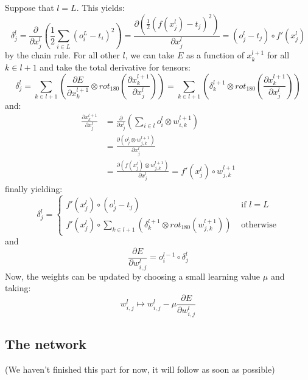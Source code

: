 \documentclass[12pt, titlepage]{article}
\begin{document}
		Suppose that $l=L$. This yields:
		\begin{equation*}
		\delta_j^l = \frac{\partial}{\partial x^l_j}\left(\frac12\sum_{i\in L}\left(o^L_i-t_i\right)^2\right) = \frac{\partial(\frac12(f(x^l_j)-t_j)^2)}{\partial x^l_j} = (o^l_j-t_j)\circ f'(x^l_j)
		\end{equation*}
		by the chain rule. For all other $l$, we can take $E$ as a function of $x^{l+1}_k$ for all $k\in l+1$ and take the total derivative for tensors:
		\begin{equation*}
		\delta^l_j = \sum_{k\in l+1}\left(\frac{\partial E}{\partial x^{l+1}_k}\otimes rot_{180}\left(\frac{\partial x^{l+1}_k}{\partial x^l_j}\right)\right) = \sum_{k\in l+1}\left(\delta^{l+1}_k\otimes rot_{180}\left(\frac{\partial x^{l+1}_k}{\partial x^l_j}\right)\right)
		\end{equation*}
		and:
		\begin{align*}
		\frac{\partial x^{l+1}_k}{\partial x^l_j} &= \frac{\partial}{\partial x^l_j}\left(\sum_{i\in l}o^l_i\otimes w^{l+1}_{i,k}\right)\\
		&=\frac{\partial(o^l_j\otimes w^{l+1}_{j,k})}{\partial x^{l}_j}\\
		&=\frac{\partial(f(x^l_j)\otimes w^{l+1}_{j,k})}{\partial x^{l}_j} =f'(x^l_j)\circ w^{l+1}_{j,k}
		\end{align*}
		finally yielding:
		\begin{equation*}
		\delta^l_j = \begin{cases}
		f'(x^l_j)\circ (o^l_j-t_j)&\text{ if $l=L$}\\
		f'(x^l_j)\circ\sum_{k\in l+1}\left(\delta^{l+1}_k\otimes rot_{180}(w^{l+1}_{j,k})\right)&\text{ otherwise}
		\end{cases}
		\end{equation*}
		and
		\begin{equation*}
		\frac{\partial E}{\partial w^l_{i,j}} = o^{l-1}_i\circ \delta^{l}_j
		\end{equation*}
		Now, the weights can be updated by choosing a small learning value $\mu$ and taking:
		\begin{equation*}
		w^{l}_{i,j}\mapsto w^{l}_{i,j}-\mu\frac{\partial E}{\partial w^l_{i,j}}
		\end{equation*}
		
		
		\subsection{The network}
		(We haven’t finished this part for now, it will follow as soon as possible)
		
\end{document}
